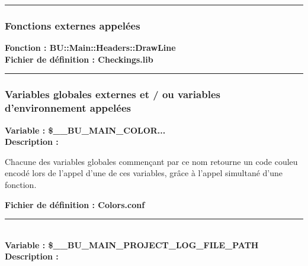 \documentclass[a4paper,10pt]{article}
\begin{document}
\setlength{\parskip}{2em}


\color{blue}\par\noindent\rule{\textwidth}{0.4pt}\color{white}\setlength{\parskip}{1em}

\color{blue}
\subsubsection{Fonctions externes appelées}\color{white}

\textbf{Fonction : \color{mauve}BU::Main::Headers::DrawLine}\\[1\baselineskip]

\textbf{Fichier de définition : \color{lime}Checkings.lib}\\[1\baselineskip]



\color{blue}\par\noindent\rule{\textwidth}{0.4pt}\color{white}

\color{blue}
\subsubsection{Variables globales externes et / ou variables d'environnement appelées}\color{white}

\textbf{Variable : \color{orange}\$\_\_BU\_MAIN\_COLOR...}\\[1\baselineskip]

\textbf{Description :}

\begin{justify}
    Chacune des variables globales commençant par ce nom retourne un code couleu encodé lors de l'appel d'une de ces variables, grâce à l'appel simultané d'une fonction.
\end{justify}

\textbf{Fichier de définition : \color{lime}Colors.conf}\\[1\baselineskip]



\color{orange}\par\noindent\rule{\textwidth}{0.4pt}\color{white}\\[1\baselineskip]

\textbf{Variable : \color{orange}\$\_\_BU\_MAIN\_PROJECT\_LOG\_FILE\_PATH}\\[1\baselineskip]

\textbf{Description :}
\end{document}
